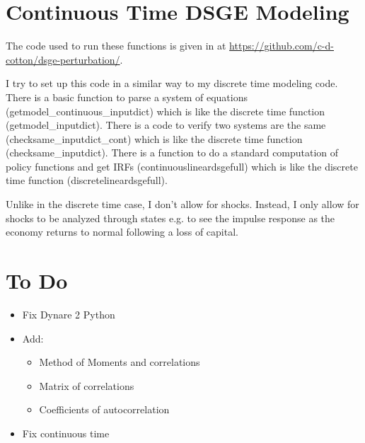\documentclass{article}
\theoremstyle{definition}
\begin{document}
\section{Continuous Time DSGE Modeling}
The code used to run these functions is given in  at \url{https://github.com/c-d-cotton/dsge-perturbation/}.

I try to set up this code in a similar way to my discrete time modeling code. There is a basic function to parse a system of equations (getmodel\_continuous\_inputdict) which is like the discrete time function (getmodel\_inputdict). There is a code to verify two systems are the same (checksame\_inputdict\_cont) which is like the discrete time function (checksame\_inputdict). There is a function to do a standard computation of policy functions and get IRFs (continuouslineardsgefull) which is like the discrete time function (discretelineardsgefull).

Unlike in the discrete time case, I don't allow for shocks. Instead, I only allow for shocks to be analyzed through states e.g. to see the impulse response as the economy returns to normal following a loss of capital.

\section{To Do}
\begin{itemize}
    \item Fix Dynare 2 Python
    \item Add:
    \begin{itemize}
        \item Method of Moments and correlations
        \item Matrix of correlations
        \item Coefficients of autocorrelation
    \end{itemize}
    \item Fix continuous time
\end{itemize}
\end{document}
